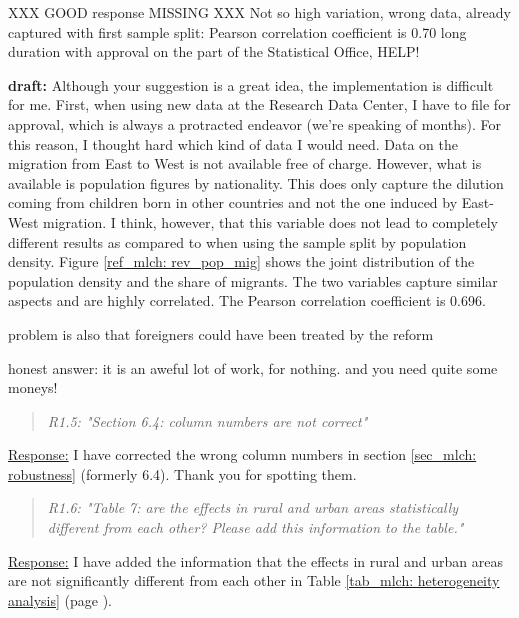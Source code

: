 {\color{red} XXX GOOD response MISSING XXX
Not so high variation, wrong data, already captured with first sample split: Pearson correlation coefficient is 0.70
long duration with approval on the part of the Statistical Office, HELP!

\textbf{draft:} Although your suggestion is a great idea, the implementation is difficult for me. First, when using new data at the Research Data Center, I have to file for approval, which is always a protracted endeavor (we're speaking of months). For this reason, I thought hard which kind of data I would need. Data on the migration from East to West is not available free of charge. However, what is available is population figures by nationality. This does only capture the dilution coming from children born in other countries and not the one induced by East-West migration. I think, however, that this variable does not lead to completely different results as compared to when using the sample split by population density. Figure \ref{ref_mlch: rev_pop_mig} shows the joint distribution of the population density and the share of migrants. The two variables capture similar aspects and are highly correlated. The Pearson correlation coefficient is 0.696.


problem is also that foreigners could have been treated by the reform


honest answer: it is an aweful lot of work, for nothing. and you need quite some moneys!
}


\bigskip\bigskip
{}
\begin{quote}
	\textit{R1.5: "Section 6.4: column numbers are not correct"}
\end{quote}
\underline{Response:} I have corrected the wrong column numbers in section \ref{sec_mlch: robustness} (formerly 6.4). Thank you for spotting them.

\bigskip\bigskip
{}
\begin{quote}
	\textit{R1.6: "Table 7: are the effects in rural and urban areas statistically different from each other? Please add this information to the table."}
\end{quote}
\underline{Response:} I have added the information that the effects in rural and urban areas are not significantly different from each other in Table \ref{tab_mlch: heterogeneity analysis} (page \pageref{tab_mlch: heterogeneity analysis}).

